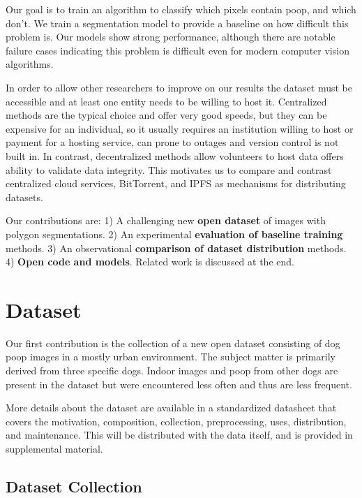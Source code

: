 \documentclass[10pt,twocolumn,letterpaper]{article}
\begin{document}
Our goal is to train an algorithm to classify which pixels contain poop, and
which don't. We train a segmentation model to provide a baseline on how
difficult this problem is. Our models show strong performance, although there
are notable failure cases indicating this problem is difficult even for modern
computer vision algorithms.

In order to allow other researchers to improve on our results the dataset must
be accessible and at least one entity needs to be willing to host it.
Centralized methods are the typical choice and offer very good speeds, 
but they can be expensive for an individual, so it usually requires an
institution willing to host or payment for a hosting service,
can prone to outages and version control is not built in.
In contrast, decentralized methods allow volunteers to host data offers ability
to validate data integrity. 
This motivates us to compare and contrast centralized cloud services,
BitTorrent, and IPFS as mechanisms for distributing datasets.



Our contributions are:
1) A challenging new \textbf{open dataset} of images with polygon segmentations.
2) An experimental \textbf{evaluation of baseline training} methods.
3) An observational \textbf{comparison of dataset distribution} methods.
4) \textbf{Open code and models}.
Related work is discussed at the end.


\section{Dataset}

Our first contribution is the collection of a new open dataset consisting of
dog poop images in a mostly urban environment. The subject matter is primarily
derived from three specific dogs. Indoor images and poop from other dogs are
present in the dataset but were encountered less often and thus are less
frequent.

More details about the dataset are available in a standardized datasheet
\cite{gebru_datasheets_2021} that covers the motivation, composition,
collection, preprocessing, uses, distribution, and maintenance. This will be
distributed with the data itself, and is provided in supplemental material.

\subsection{Dataset Collection}
\end{document}
